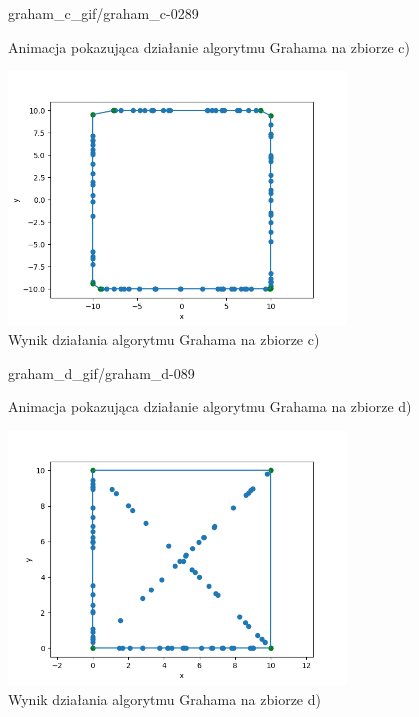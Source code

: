\documentclass[a4paper]{article}
\begin{document}
\begin{figure}[H]
    {graham_c_gif/graham_c-}{0}{289}
    \centering
    \caption{Animacja pokazująca działanie algorytmu Grahama na zbiorze c)}
    \label{fig:anim_graham_c}
\end{figure}

\begin{figure}[H]
    \centering
    \includegraphics[width=0.8\textwidth]{graham/graham_c_png.png}
    \caption{Wynik działania algorytmu Grahama na zbiorze c)}
    \label{fig:graham_c}
\end{figure}

\begin{figure}[H]
    {graham_d_gif/graham_d-}{0}{89}
    \centering
    \caption{Animacja pokazująca działanie algorytmu Grahama na zbiorze d)}
    \label{fig:anim_graham_d}
\end{figure}

\begin{figure}[H]
    \centering
    \includegraphics[width=0.8\textwidth]{graham/graham_d_png.png}
    \caption{Wynik działania algorytmu Grahama na zbiorze d)}
    \label{fig:graham_d}
\end{figure}
\end{document}
